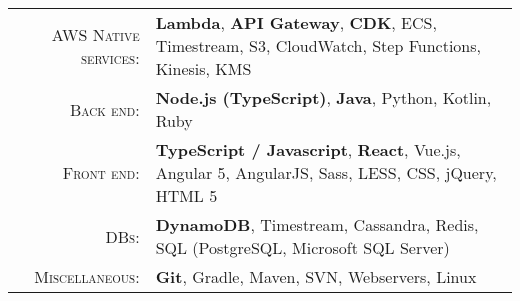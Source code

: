 %
%
%

\renewcommand{\arraystretch}{1.1}

	\begin{tabular}{>{}r>{}p{13cm}}
		\textsc{AWS Native services:} &
			\textbf{Lambda}, \textbf{API Gateway}, \textbf{CDK}, ECS, Timestream, S3, CloudWatch, Step Functions, Kinesis, KMS  \\
		\textsc{Back end:} &
			\textbf{Node.js (TypeScript)}, \textbf{Java}, Python, Kotlin, Ruby \\
		\textsc{Front end:} &
			\textbf{TypeScript / Javascript}, \textbf{React}, Vue.js, Angular 5, AngularJS, Sass, LESS, CSS, jQuery, HTML 5 \\
		\textsc{DBs:} &
			\textbf{DynamoDB}, Timestream, Cassandra, Redis, SQL (PostgreSQL, Microsoft SQL Server) \\
		\textsc{Miscellaneous:} &
			\textbf{Git}, Gradle, Maven, SVN, Webservers, Linux \\
	\end{tabular}
